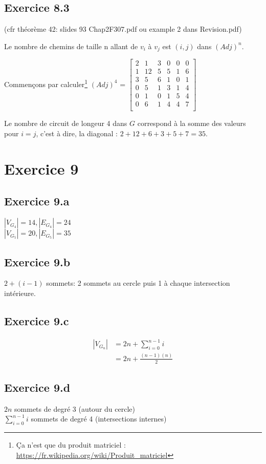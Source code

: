 \documentclass[fontsize=10pt]{article}
\begin{document}
\subsection*{Exercice 8.3}
(cfr théorème 42: slides 93 Chap2F307.pdf ou example 2 dans Revision.pdf)
\par Le nombre de chemins de taille n allant de $v_i$ à $v_j$ est $(i,j)$ dans
$(Adj)^n$.

Commençons par calculer\footnote{Ça n'est que du produit matriciel : \url{https://fr.wikipedia.org/wiki/Produit_matriciel}} $(Adj)^4$ = $\begin{bmatrix}
    2 &1 &3 &0 &0 &0 \\
    1 &12&5 &5 &1 &6 \\
    3 &5 &6 &1 &0 &1 \\
    0 &5 &1 &3 &1 &4 \\
    0 &1 &0 &1 &5 &4 \\
    0 &6 &1 &4 &4 &7 \\
\end{bmatrix}$

Le nombre de circuit de longeur 4 dans $G$ correspond à la somme des valeurs
pour $i = j$, c'est à dire, la diagonal : $2 + 12 + 6 + 3 + 5 + 7 = 35$.


\section*{Exercice 9}
\subsection*{Exercice 9.a}
$|V_{G_4}| = 14, |E_{G_4}| = 24$\\
$|V_{G_5}| = 20, |E_{G_5}| = 35$

\subsection*{Exercice 9.b}
$2+(i-1)$ sommets: 2 sommets au cercle puis 1 à chaque intersection intérieure.

\subsection*{Exercice 9.c}
\begin{align*}
    |V_{G_n}| &= 2n + \displaystyle\sum_{i=0}^{n-1} i\\
               &= 2n + \frac{(n-1)(n)}{2}
\end{align*}

\subsection*{Exercice 9.d}
$2n$ sommets de degré 3 (autour du cercle)\\
$\displaystyle\sum_{i=0}^{n-1} i$ sommets de degré 4 (intersections internes)\\
\end{document}
